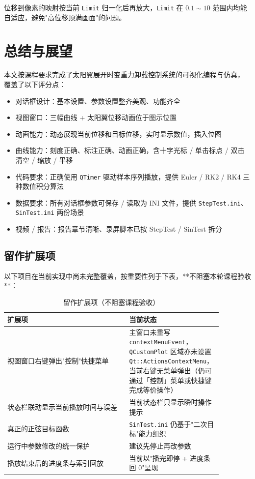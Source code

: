 \documentclass[UTF8, a4paper, fontset=none]{ctexart}
\begin{document}
位移到像素的映射按当前 \texttt{Limit} 归一化后再放大，\texttt{Limit} 在
$0.1 \sim 10$ 范围内均能自适应，避免"高位移顶满画面"的问题。

\section{总结与展望}

本文按课程要求完成了太阳翼展开时变重力卸载控制系统的可视化编程与仿真，
覆盖了以下评分点：

\begin{itemize}[leftmargin=*]
  \item 对话框设计：基本设置、参数设置整齐美观、功能齐全
  \item 视图窗口：三幅曲线 + 太阳翼位移动画位于图示位置
  \item 动画能力：动态展现当前位移和目标位移，实时显示数值，插入位图
  \item 曲线能力：刻度正确、标注正确、动画正确，含十字光标 / 单击标点 /
        双击清空 / 缩放 / 平移
  \item 代码要求：正确使用 \texttt{QTimer} 驱动样本序列播放，提供 Euler /
        RK2 / RK4 三种数值积分算法
  \item 数据要求：所有对话框参数可保存 / 读取为 INI 文件，提供
        \texttt{StepTest.ini}、\texttt{SinTest.ini} 两份场景
  \item 视频 / 报告：报告章节清晰、录屏脚本已按 StepTest / SinTest 拆分
\end{itemize}

\subsection*{留作扩展项} \label{sec:gap}

以下项目在当前实现中尚未完整覆盖，按重要性列于下表，**不阻塞本轮课程验收**：

\begin{table}[H]
\centering
\begin{tabular}{p{0.55\linewidth}p{0.32\linewidth}}
\toprule
扩展项 & 当前状态 \\
\midrule
视图窗口右键弹出"控制"快捷菜单 & 主窗口未重写 \texttt{contextMenuEvent}，
     \texttt{QCustomPlot} 区域亦未设置 \texttt{Qt::ActionsContextMenu}，
     当前右键无菜单弹出（仍可通过「控制」菜单或快捷键完成等价操作） \\
状态栏联动显示当前播放时间与误差 & 当前状态栏只显示瞬时操作提示 \\
真正的正弦目标函数 & \texttt{SinTest.ini} 仍基于"二次目标"能力组织 \\
运行中参数修改的统一保护 & 建议先停止再改参数 \\
播放结束后的进度条与索引回放 & 当前以"播完即停 + 进度条回 0"呈现 \\
\bottomrule
\end{tabular}
\caption{留作扩展项（不阻塞课程验收）}
\end{table}
\end{document}
